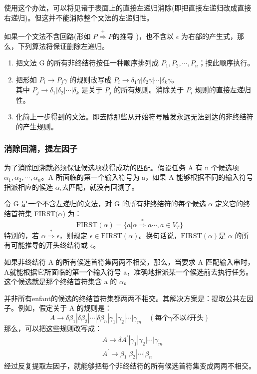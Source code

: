 使用这个办法，可以将见诸于表面上的直接左递归消除(即把直接左递归改成直接右递归)。但这并不能消除整个文法的左递归性。

如果一个文法不含回路(形如 $P \stackrel{+}{\Rightarrow} P 的推导$ )，也不含以 $\epsilon$ 为右部的产生式，那么，下列算法将保证删除左递归。

\begin{enumerate}
    \item 把文法 G 的所有非终结符按任一种顺序排列成 $P_1,P_2,\cdots,P_n$；按此顺序执行。
    \item 把形如 $P_i \rightarrow P_j \gamma$ 的规则改写成 $P_i \rightarrow \delta_1\gamma | \delta_2\gamma | \cdots | \delta_k\gamma$。\\
    其中 $P_j \rightarrow \delta_1 | \delta_2 | \cdots | \delta_k$ 是关于 $P_j$ 的所有规则。消除关于 $P_i$ 规则的直接左递归性。
    \item 化简上一步得到的文法。即去除那些从开始符号触发永远无法到达的非终结符的产生规则。
\end{enumerate}

\subsubsection{消除回溯，提左因子}

为了消除回溯就必须保证候选项获得成功的匹配。假设任务 A 有 n 个候选项 $\alpha_1,\alpha_2,\cdots,\alpha_n$。A 所面临的第一个输入符号为 a，如果 A 能够根据不同的输入符号指派相应的候选 $\alpha_i$去匹配，就没有回溯了。

令 G 是一个不含左递归的文法，对 G 的所有非终结符的每个候选 $\alpha$ 定义它的终结首符集 FIRST($\alpha$) 为：
\[\text{FIRST}(\alpha) = \{ a | \alpha \stackrel{*}{\Rightarrow} a \cdots, a \in V_{T} \}\]
特别的，若 $\alpha \stackrel{*}{\Rightarrow} \epsilon$，则规定 $\epsilon \in \text{FIRST}(\alpha)$。换句话说，$\text{FIRST}(\alpha)$是 $\alpha$ 的所有可能推导的开头终结符或 $\epsilon$。

如果非终结符 A 的所有候选首符集两两不相交，那么，当要求 A 匹配输入串时，A就能根据它所面临的第一个输入符号 a，准确地指派某一个候选前去执行任务。这个候选就是那个终结首符集含 a 的 $\alpha$。

并非所有enfant的候选的终结首符集都两两不相交。其解决方案是：提取公共左因子。例如，假定关于 A 的规则是：
\[ A \rightarrow \delta \beta_1 | \delta \beta_2 | \cdots | \delta \beta_n | \gamma_1 | \gamma_2 | \cdots | \gamma_m \quad (\text{每个} \gamma \text{不以} \delta \text{开头}) \]
那么，可以把这些规则改写成：
\begin{equation}
    \begin{aligned}
        &A \rightarrow \delta A^{'} | \gamma_1 | \gamma_2 | \cdots | \gamma_m \\
        &A^{'} \rightarrow \beta_1 | \beta_2 | \cdots | \beta_n \nonumber
    \end{aligned}
\end{equation}
经过反复提取左因子，就能够把每个非终结符的所有候选首符集变成两两不相交。

